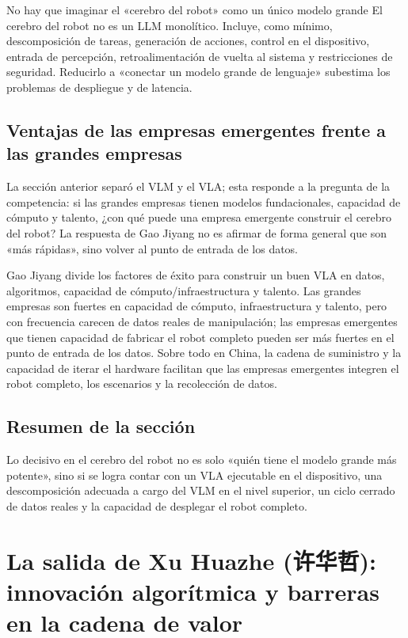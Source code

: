 \documentclass[a4paper]{article}
\begin{document}
\begin{warningbox}{No hay que imaginar el «cerebro del robot» como un único modelo grande}
El cerebro del robot no es un LLM monolítico. Incluye, como mínimo, descomposición de tareas, generación de acciones, control en el dispositivo, entrada de percepción, retroalimentación de vuelta al sistema y restricciones de seguridad. Reducirlo a «conectar un modelo grande de lenguaje» subestima los problemas de despliegue y de latencia.
\end{warningbox}

\subsection{Ventajas de las empresas emergentes frente a las grandes empresas}

La sección anterior separó el VLM y el VLA; esta responde a la pregunta de la competencia: si las grandes empresas tienen modelos fundacionales, capacidad de cómputo y talento, ¿con qué puede una empresa emergente construir el cerebro del robot? La respuesta de Gao Jiyang no es afirmar de forma general que son «más rápidas», sino volver al punto de entrada de los datos.

Gao Jiyang divide los factores de éxito para construir un buen VLA en datos, algoritmos, capacidad de cómputo/infraestructura y talento. Las grandes empresas son fuertes en capacidad de cómputo, infraestructura y talento, pero con frecuencia carecen de datos reales de manipulación; las empresas emergentes que tienen capacidad de fabricar el robot completo pueden ser más fuertes en el punto de entrada de los datos. Sobre todo en China, la cadena de suministro y la capacidad de iterar el hardware facilitan que las empresas emergentes integren el robot completo, los escenarios y la recolección de datos.

\subsection{Resumen de la sección}

Lo decisivo en el cerebro del robot no es solo «quién tiene el modelo grande más potente», sino si se logra contar con un VLA ejecutable en el dispositivo, una descomposición adecuada a cargo del VLM en el nivel superior, un ciclo cerrado de datos reales y la capacidad de desplegar el robot completo.
\section{La salida de Xu Huazhe (许华哲): innovación algorítmica y barreras en la cadena de valor}
\end{document}
